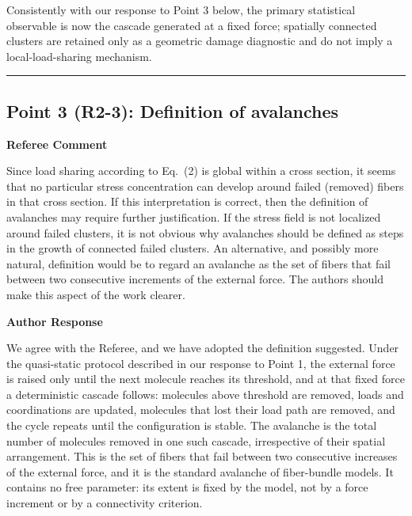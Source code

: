 \documentclass[11pt]{article}
\newenvironment{refereecomment}
  {%
    \par
    \begingroup
    \color{commentgray}
    \itshape
    \setlength{\leftskip}{1.4em}
    \setlength{\rightskip}{1.4em}
  }
  {%
    \par
    \endgroup
  }
\newcommand{\refereelabel}{%
  \par\smallskip
  {\color{commentgray}\bfseries Referee Comment}\par
}
\newcommand{\responselabel}{%
  \par\medskip
  {\color{responseblue}\bfseries Author Response}\par
}
\newcommand{\pointseparator}{%
  \par\bigskip
  {\color{rulegray}\hrule}
  \par\bigskip
}
\begin{document}
Consistently with our response to Point 3 below, the primary statistical
observable is now the cascade generated at a fixed force; spatially connected
clusters are retained only as a geometric damage diagnostic and do not imply a
local-load-sharing mechanism.


\pointseparator


\subsection*{Point 3 (R2-3): Definition of avalanches}

\refereelabel
\begin{refereecomment}
  Since load sharing according to Eq.~(2) is global within a cross section, it
  seems that no particular stress concentration can develop around failed
  (removed) fibers in that cross section. If this interpretation is correct,
  then the definition of avalanches may require further justification. If the
  stress field is not localized around failed clusters, it is not obvious why
  avalanches should be defined as steps in the growth of connected failed
  clusters. An alternative, and possibly more natural, definition would be to
  regard an avalanche as the set of fibers that fail between two consecutive
  increments of the external force. The authors should make this aspect of the
  work clearer.
\end{refereecomment}

\responselabel

We agree with the Referee, and we have adopted the definition suggested. Under
the quasi-static protocol described in our response to Point 1, the external
force is raised only until the next molecule reaches its threshold, and at that
fixed force a deterministic cascade follows: molecules above threshold are
removed, loads and coordinations are updated, molecules that lost their load
path are removed, and the cycle repeats until the configuration is stable. The
avalanche is the total number of molecules removed in one such cascade,
irrespective of their spatial arrangement. This is the set of fibers that fail
between two consecutive increases of the external force, and it is the standard
avalanche of fiber-bundle models. It contains no free parameter: its extent is
fixed by the model, not by a force increment or by a connectivity criterion.
\end{document}
